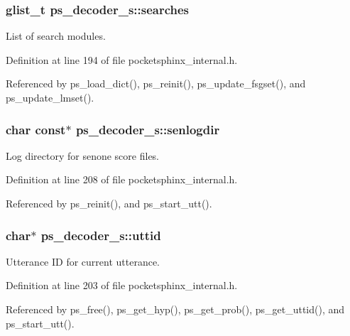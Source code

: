 \subsubsection[{searches}]{\setlength{\rightskip}{0pt plus 5cm}glist\-\_\-t ps\-\_\-decoder\-\_\-s\-::searches}\label{structps__decoder__s_aa04a75334c8bc39c6e1dc4b1de1d760f}


List of search modules. 



Definition at line 194 of file pocketsphinx\-\_\-internal.\-h.



Referenced by ps\-\_\-load\-\_\-dict(), ps\-\_\-reinit(), ps\-\_\-update\-\_\-fsgset(), and ps\-\_\-update\-\_\-lmset().

\subsubsection[{senlogdir}]{\setlength{\rightskip}{0pt plus 5cm}char const$\ast$ ps\-\_\-decoder\-\_\-s\-::senlogdir}\label{structps__decoder__s_a0ed3476113fe3d63b13ac5e8da3f3b4f}


Log directory for senone score files. 



Definition at line 208 of file pocketsphinx\-\_\-internal.\-h.



Referenced by ps\-\_\-reinit(), and ps\-\_\-start\-\_\-utt().

\subsubsection[{uttid}]{\setlength{\rightskip}{0pt plus 5cm}char$\ast$ ps\-\_\-decoder\-\_\-s\-::uttid}\label{structps__decoder__s_a0c21a99a0cb1e71cf7811f99cc17c105}


Utterance I\-D for current utterance. 



Definition at line 203 of file pocketsphinx\-\_\-internal.\-h.



Referenced by ps\-\_\-free(), ps\-\_\-get\-\_\-hyp(), ps\-\_\-get\-\_\-prob(), ps\-\_\-get\-\_\-uttid(), and ps\-\_\-start\-\_\-utt().

